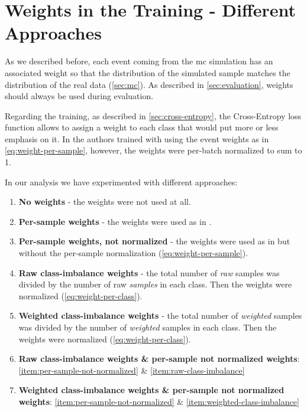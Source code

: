 \section{Weights in the Training - Different Approaches}
\label{sec:weights}

As we described before, each event coming from the \gls{mc} simulation has an associated weight so that the distribution
of the simulated sample matches the distribution of the real data (\autoref{sec:mc}). As described in
\autoref{sec:evaluation}, weights should always be used during evaluation.

Regarding the training, as described in \autoref{sec:cross-entropy}, the Cross-Entropy loss function allows to
assign a weight to each class that would put more or less emphasis on it. In \cite{jan} the authors trained with
using the event weights as in \autoref{eq:weight-per-sample}, however, the weights were per-batch normalized to
sum to 1.

In our analysis we have experimented with different approaches:

\begin{enumerate}
      \item \textbf{No weights} - the weights were not used at all.
      \item \textbf{Per-sample weights} - the weights were used as in \cite{jan}.
      \item \textbf{Per-sample weights, not normalized} - the weights were used as in \cite{jan} but without the
            per-sample normalization (\autoref{eq:weight-per-sample}). \label{item:per-sample-not-normalized}
      \item \textbf{Raw class-imbalance weights} - the total number of \emph{raw}
            samples was divided by the number of raw \emph{samples} in each class. Then the weights were normalized
            (\autoref{eq:weight-per-class}).  \label{item:raw-class-imbalance}
      \item \textbf{Weighted class-imbalance weights} - the total number of \emph{weighted} samples was divided by
            the number of \emph{weighted} samples in each class. Then the weights were normalized
            (\autoref{eq:weight-per-class}). \label{item:weighted-class-imbalance}
      \item \textbf{Raw class-imbalance weights \& per-sample not normalized weights}:
            \autoref{item:per-sample-not-normalized} \& \autoref{item:raw-class-imbalance}
      \item \textbf{Weighted class-imbalance weights \& per-sample not normalized weights}:
            \autoref{item:per-sample-not-normalized} \& \autoref{item:weighted-class-imbalance}
\end{enumerate}

